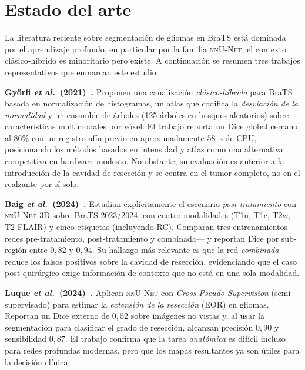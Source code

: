 \documentclass[conference]{IEEEtran}
\begin{document}
\section{Estado del arte}
\label{sec:sota}
La literatura reciente sobre segmentación de gliomas en BraTS está
dominada por el aprendizaje profundo, en particular por la
familia \textsc{nnU-Net}; el contexto clásico-híbrido es minoritario
pero existe. A continuación se resumen tres trabajos representativos
que enmarcan este estudio.

\textbf{Győrfi \emph{et al.}~(2021)~\cite{gyorfi2021ensemble}.}
Proponen una canalización \emph{clásico-híbrida} para BraTS basada
en normalización de histogramas, un atlas que codifica la
\emph{desviación de la normalidad} y un ensamble de árboles
(125 árboles en bosques aleatorios) sobre características
multimodales por vóxel. El trabajo reporta un Dice global cercano
al $86\%$ con un registro afín previo en aproximadamente
$58$~s de CPU, posicionando los métodos basados en intensidad y
atlas como una alternativa competitiva en hardware modesto. No
obstante, su evaluación es anterior a la introducción de la
cavidad de resección y se centra en el tumor completo, no en el
realzante por sí solo.

\textbf{Baig \emph{et al.}~(2024)~\cite{baig2024nnunet}.} Estudian
explícitamente el escenario \emph{post-tratamiento} con
\textsc{nnU-Net 3D} sobre BraTS 2023/2024, con cuatro modalidades
(T1n, T1c, T2w, T2-FLAIR) y cinco etiquetas (incluyendo RC).
Comparan tres entrenamientos ---redes pre-tratamiento,
post-tratamiento y combinada--- y reportan Dice por sub-región
entre $0{,}82$ y $0{,}94$. Su hallazgo más relevante es que la red
\emph{combinada} reduce los falsos positivos sobre la cavidad de
resección, evidenciando que el caso post-quirúrgico exige
información de contexto que no está en una sola modalidad.

\textbf{Luque \emph{et al.}~(2024)~\cite{luque2024extension}.}
Aplican \textsc{nnU-Net} con \emph{Cross Pseudo Supervision}
(semi-supervisado) para estimar la \emph{extensión de la resección}
(EOR) en gliomas. Reportan un Dice externo de $0{,}52$ sobre
imágenes no vistas y, al usar la segmentación para clasificar el
grado de resección, alcanzan precisión $0{,}90$ y sensibilidad
$0{,}87$. El trabajo confirma que la tarea \emph{anatómica} es
difícil incluso para redes profundas modernas, pero que los mapas
resultantes ya son útiles para la decisión clínica.
\end{document}
